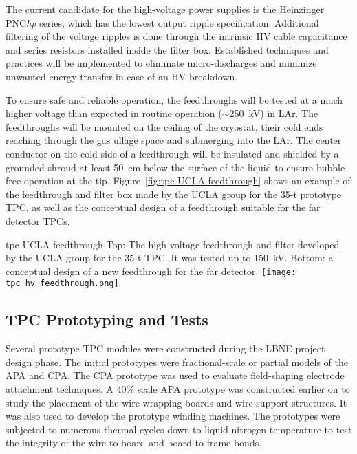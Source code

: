 The current candidate for the high-voltage power supplies is the
Heinzinger PNC{\it hp} series, which has the lowest output ripple
specification.  Additional filtering of the voltage ripples is done
through the intrinsic HV cable capacitance and series resistors
installed inside the filter box. Established techniques and practices
will be implemented to eliminate micro-discharges and minimize
unwanted energy transfer in case of an HV breakdown.
  
To ensure safe and reliable operation, the feedthroughs will be tested
at a much higher voltage than expected in routine operation
($\sim$250~kV) in LAr. The feedthroughs will be mounted on
the ceiling of the cryostat, their cold ends reaching through the gas
ullage space and submerging into the LAr. The center
conductor on the cold side of a feedthrough will be insulated and
shielded by a grounded shroud at least 50~cm below the surface of the
liquid to ensure bubble free operation at the
tip. Figure~\ref{fig:tpc-UCLA-feedthrough} shows an example of the
feedthrough and filter box made by the UCLA group for the 35-t prototype TPC,
as well as the conceptual design of a feedthrough suitable for the far
detector TPCs.
\begin{cdrfigure}{tpc-UCLA-feedthrough}
{Top: The high voltage feedthrough and filter developed by the UCLA 
group for the 35-t TPC.  It was tested up to 150~kV.  
Bottom: a conceptual design of a new feedthrough for the far detector.}
\texttt{[image: tpc\_hv\_feedthrough.png]}
\end{cdrfigure}


\subsection{TPC Prototyping and Tests}
\label{subsec:fd-ref-tpc-proto}


Several prototype TPC modules were constructed during the LBNE project
design phase.  The initial prototypes were fractional-scale or partial
models of the APA and CPA. The CPA prototype was used to evaluate
field-shaping electrode attachment techniques. A 40\% scale APA
prototype was constructed earlier on to study the placement of the
wire-wrapping boards and wire-support structures. It was also used to
develop the prototype winding machines. The prototypes were subjected
to numerous thermal cycles down to liquid-nitrogen temperature to test
the integrity of the wire-to-board and board-to-frame bonds.


